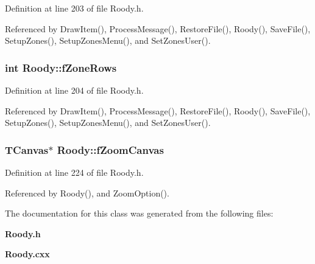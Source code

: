 Definition at line 203 of file Roody.h.

Referenced by DrawItem(), ProcessMessage(), RestoreFile(), Roody(), SaveFile(), SetupZones(), SetupZonesMenu(), and SetZonesUser().
\subsubsection[{fZoneRows}]{\setlength{\rightskip}{0pt plus 5cm}int {\bf Roody::fZoneRows}\hspace{0.3cm}{\ttfamily  [private]}}\label{classRoody_a04bbe3023ac4bdaf56817e0d21a8db09}


Definition at line 204 of file Roody.h.

Referenced by DrawItem(), ProcessMessage(), RestoreFile(), Roody(), SaveFile(), SetupZones(), SetupZonesMenu(), and SetZonesUser().
\subsubsection[{fZoomCanvas}]{\setlength{\rightskip}{0pt plus 5cm}TCanvas$\ast$ {\bf Roody::fZoomCanvas}\hspace{0.3cm}{\ttfamily  [private]}}\label{classRoody_ad666d0f7042bcf625f8538546b2f4cb9}


Definition at line 224 of file Roody.h.

Referenced by Roody(), and ZoomOption().

The documentation for this class was generated from the following files:\begin{DoxyCompactItemize}
\item 
{\bf Roody.h}\item 
{\bf Roody.cxx}\end{DoxyCompactItemize}
